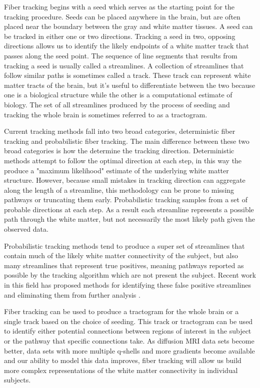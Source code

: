 Fiber tracking begins with a seed which serves as the starting point for the tracking procedure. Seeds can be placed anywhere in the brain, but are often placed near the boundary between the gray and white matter tissues. A seed can be tracked in either one or two directions. Tracking a seed in two, opposing directions allows us to identify the likely endpoints of a white matter track that passes along the seed point. The sequence of line segments that results from tracking a seed is usually called a streamlines. A collection of streamlines that follow similar paths is sometimes called a track. These track can represent white matter tracts of the brain, but it's useful to differentiate between the two because one is a biological structure while the other is a computational estimate of biology. The set of all streamlines produced by the process of seeding and tracking the whole brain is sometimes referred to as a tractogram.

Current tracking methods fall into two broad categories, deterministic fiber tracking and probabilistic fiber tracking. The main difference between these two broad categories is how the determine the tracking direction. Deterministic methods attempt to follow the optimal direction at each step, in this way the produce a "maximum likelihood" estimate of the underlying white matter structure. However, because small mistakes in tracking direction can aggregate along the length of a streamline, this methodology can be prone to missing pathways or truncating them early. Probabilistic tracking samples from a set of probable directions at each step. As a result each streamline represents a possible path through the white matter, but not necessarily the most likely path given the observed data.

Probabilistic tracking methods tend to produce a super set of streamlines that contain much of the likely white matter connectivity of the subject, but also many streamlines that represent true positives, meaning pathways reported as possible by the tracking algorithm which are not present the subject. Recent work in this field has proposed methods for identifying these false positive streamlines and eliminating them from further analysis \cite{Smith_2013}.

Fiber tracking can be used to produce a tractogram for the whole brain or a single track based on the choice of seeding. This track or tractogram can be used to identify either potential connections between regions of interest in the subject or the pathway that specific connections take. As diffusion MRI data sets become better, data sets with more multiple q-shells and more gradients become available and our ability to model this data improves, fiber tracking will allow us build more complex representations of the white matter connectivity in individual subjects.
